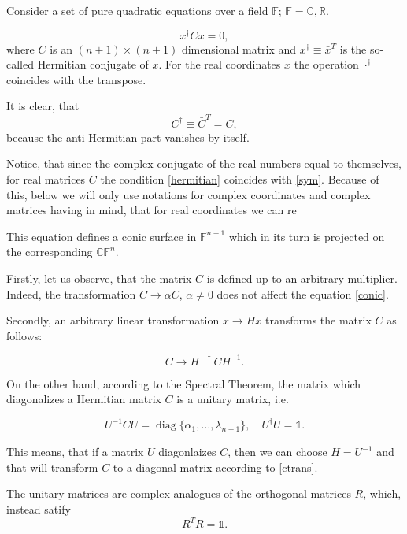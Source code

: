 \documentclass[a4paper,10pt]{article}
\newcommand{\diag}{\mathop{\mathrm{diag}}}
\begin{document}
Consider a set of pure quadratic equations over a field $\mathbb{F}$;  $\mathbb{F} = \mathbb{C}, \mathbb{R}$.

\begin{equation}
 x^\dag C x = 0,\label{conic}
\end{equation}
where  $C$ is an $(n+1) \times (n+1)$ dimensional matrix and $x^\dag \equiv {\bar x}^T$ is the so-called Hermitian conjugate of $x$. For the real coordinates $x$ the operation $\cdot^\dag$ coincides with the transpose. 

It is clear, that 
\begin{equation}
 C^\dag\equiv {\bar C}^T= C,\label{hermitian}
\end{equation}
because the anti-Hermitian part vanishes by itself. 

Notice, that since the complex conjugate of the real numbers equal to themselves, for real matrices $C$ the condition \eqref{hermitian} coincides with \eqref{sym}. Because of this,  below we will only use notations for complex coordinates and complex matrices having in mind, that for real coordinates we can re


This equation defines a conic surface in $\mathbb{F}^{n+1}$ which in its turn is projected on the corresponding $\mathbb{CF}^n$. 

Firstly, let us observe, that the matrix $C$ is defined up to an arbitrary multiplier. Indeed, the transformation $C\to \alpha C$, $\alpha\neq 0$ does not affect the equation \eqref{conic}.

Secondly, an arbitrary linear transformation $x \to H x$ transforms the matrix $C$ as follows:

\begin{equation}
 C \to H^{-\dag} C H^{-1}.\label{ctrans}
\end{equation}

On the other hand, according to the Spectral Theorem, the matrix which diagonalizes a Hermitian matrix $C$ is a unitary matrix, i.e. 

\begin{equation}
 U^{-1} C U = \diag\{\alpha_1,\ldots, \lambda_{n+1}\},\quad  U^\dag U = \mathbb{1}.
\end{equation}

This means, that if a matrix $U$ diagonlaizes $C$, then we can choose $H=U^{-1}$ and that will transform $C$ to a diagonal matrix according to \eqref{ctrans}. 

The unitary matrices are complex analogues of the orthogonal matrices $R$, which, instead satify 
\begin{equation}
 R^TR=\mathbb{1}.
\end{equation}
\end{document}
